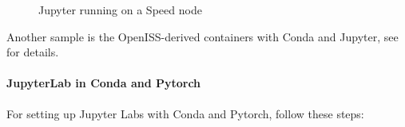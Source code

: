 \begin{figure}[htbp]
	\centering
	\caption{Jupyter running on a Speed node}
	\label{fig:jupyter}
\end{figure}

\noindent
Another sample is the OpenISS-derived containers with Conda and Jupyter,
see  for details.

\paragraph{JupyterLab in Conda and Pytorch}
\label{sect:jupyterlabs}

For setting up Jupyter Labs with Conda and Pytorch, follow these steps:

